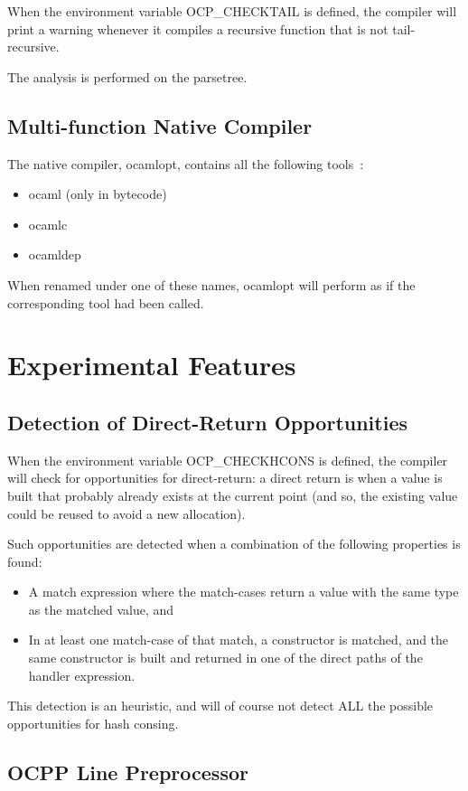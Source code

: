 When the environment variable {\sf OCP\_CHECKTAIL} is defined, the
compiler will print a warning whenever it compiles a recursive
function that is not tail-recursive.

The analysis is performed on the parsetree.

\subsection{Multi-function Native Compiler}

The native compiler, {\sf ocamlopt}, contains all the following tools~:
\begin{itemize}
\item {\sf ocaml} (only in bytecode)
\item {\sf ocamlc}
\item {\sf ocamldep}
\end{itemize}

When renamed under one of these names, {\sf ocamlopt} will perform as
if the corresponding tool had been called.

\section{Experimental Features}

\subsection{Detection of Direct-Return Opportunities}

When the environment variable {\sf OCP\_CHECKHCONS} is defined, the
compiler will check for opportunities for direct-return: a direct
return is when a value is built that probably already exists at the
current point (and so, the existing value could be reused to avoid a
new allocation).

Such opportunities are detected when a combination of the following
properties is found:
\begin{itemize}
\item A {\sf match} expression where the match-cases return a value
  with the same type as the matched value, and
\item In at least one match-case of that match, a constructor is
  matched, and the same constructor is built and returned in one of
  the direct paths of the handler expression.
\end{itemize}

This detection is an heuristic, and will of course not detect ALL the
possible opportunities for hash consing.

\subsection{OCPP Line Preprocessor}
